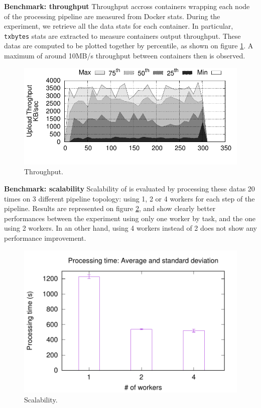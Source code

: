 \textbf{Benchmark: throughput}
Throughput accross containers wrapping each node of the processing pipeline are measured from Docker stats.
During the experiment, we retrieve all the data stats for each container.
In particular, \texttt{txbytes} stats are extracted to measure containers output throughput.
These datas are computed to be plotted together by percentile, as shown on figure \ref{fig:throughput}.
A maximum of around 10MB/s throughput between containers then is observed.


\begin{figure}[t!]
  \centering
  \includegraphics[width=.99\linewidth]{images/tput_upload}
  \caption{Throughput.}
  \label{fig:throughput}
\end{figure}

\textbf{Benchmark: scalability}
Scalability of \SYS is evaluated by processing these datas 20 times on 3 different pipeline topology: using 1, 2 or 4 workers for each step of the pipeline.
Results are represented on figure \ref{fig:scalability}, and show clearly better performances between the experiment using only one worker by task, and the one using 2 workers.
In an other hand, using 4 workers instead of 2 does not show any performance improvement.

\begin{figure}[t!]
  \centering
  \includegraphics[width=.99\linewidth]{images/avg_stdev_4_streams}
  \caption{Scalability.}
  \label{fig:scalability}
\end{figure}

